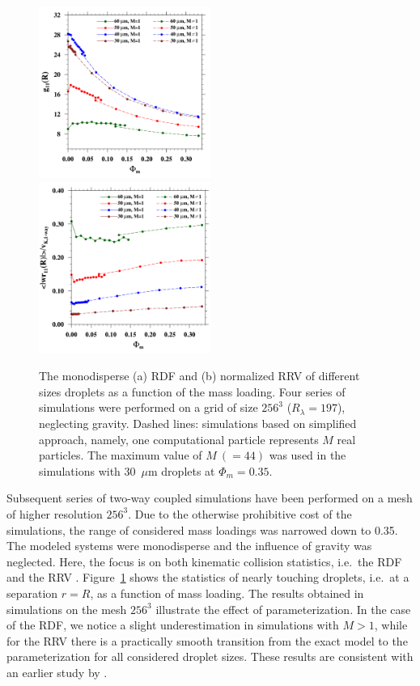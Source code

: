 \documentclass[../thesis.tex]{subfiles}
\begin{document}
\begin{figure}[h!]%
\includegraphics[width=0.5\textwidth]{./figs/IJMF/Figure3a.pdf}
\includegraphics[width=0.5\textwidth]{./figs/IJMF/Figure3b.pdf}
\caption{The monodisperse (a) RDF and (b) normalized RRV of different sizes droplets as a function of the mass loading. Four series of simulations were performed on a grid of size $256^3$ ($R_{\lambda}=197$), neglecting gravity. Dashed lines: simulations based on simplified approach, namely, one computational particle represents $M$ real particles. The maximum value of $M~(=44)$ was used in the simulations with 30~$\mu$m droplets at $\Phi_m = 0.35$.}
\label{fig3}
\end{figure}%

Subsequent series of two-way coupled simulations have been performed on a mesh of higher resolution $256^3$. Due to the otherwise prohibitive cost of the simulations, the range of considered mass loadings was narrowed down to 0.35. The modeled systems were monodisperse and the influence of gravity was neglected. Here, the focus is on both kinematic collision statistics, i.e.\ the RDF and the RRV \citep[see][for the definition]{RPAGW13}. Figure~\ref{fig3} shows the statistics of nearly touching droplets, i.e.\ at a separation $r = R$, as a function of mass loading. The results obtained in simulations on the mesh $256^3$ illustrate the effect of parameterization. In the case of the RDF, we notice a slight underestimation in simulations with $M>1$, while for the RRV there is a practically smooth transition from the exact model to the parameterization for all considered droplet sizes. These results are consistent with an earlier study by \cite{RPW20}.
\end{document}
